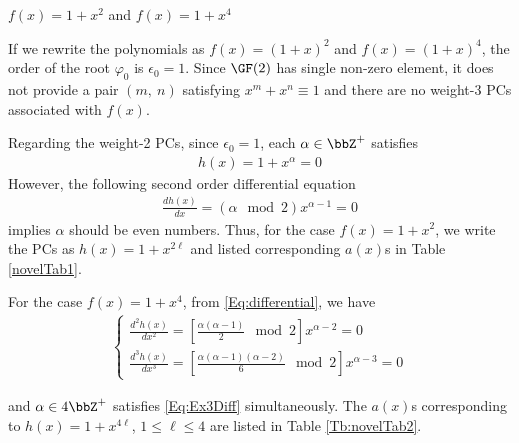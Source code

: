 \begin{example}
	$f(x)=1+x^2$ and $f(x)=1+x^4$\newline
	
	If we rewrite the polynomials as $f(x)=(1+x)^2$ and $f(x)=(1+x)^4$,	the order of the root $\varphi_0$ is $\epsilon_0=1$. Since $\GF(2)$ has single non-zero element, it does not provide a pair $(m,~n)$ satisfying $x^m+x^n \equiv 1$ and there are no weight-3 PCs associated with $f(x)$.
	
	Regarding the weight-2 PCs, since $\epsilon_0 = 1$, each $\alpha \in \bbZ^+$ satisfies
	\begin{align}
		h(x) = 1+x^\alpha = 0
	\end{align}
	However, the following second order differential equation
	\begin{align}
	\frac{dh(x)}{dx} = (\alpha\mod 2) x^{\alpha-1} = 0
	\end{align}
	implies $\alpha$ should be even numbers. Thus, for the case $f(x) = 1+x^2$, we write the PCs as  $h(x)=1+x^{2\ell}$ and listed corresponding $a(x)$s in Table \ref{novelTab1}.
	

	For the case $f(x) = 1+x^4$, from \eqref{Eq:differential}, we have
	\begin{align}
		\begin{cases}
		\frac{d^2h(x)}{dx^2} = \left[\frac{\alpha(\alpha-1)}{2} \mod 2\right]x^{\alpha-2} = 0 \\
		\frac{d^3h(x)}{dx^3} = \left[\frac{\alpha(\alpha-1)(\alpha-2)}{6} \mod 2\right]x^{\alpha-3} = 0
		\end{cases}
		\label{Eq:Ex3Diff}
	\end{align}
\label{ex-3}
\end{example}
and $\alpha \in 4\bbZ^+$ satisfies \eqref{Eq:Ex3Diff} simultaneously. The $a(x)$s corresponding to $h(x)=1+x^{4\ell}$, $1 \leq \ell \leq 4$ are listed in Table \ref{Tb:novelTab2}.
